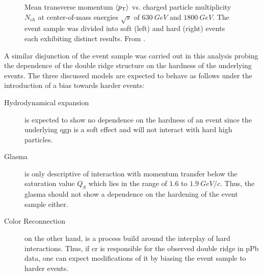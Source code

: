 \begin{figure}
\begin{subfigure}[b]{0.45\textwidth}
  \end{subfigure}
  \caption[Mean transverse momentum $\left< \pt \right>$ vs. charged particle multiplicity $N_{ch}$ at center-of-mass energies $\sqrt{s}$ of $\SI{630}{GeV}$ and $\SI{1800}{GeV}$.]{Mean transverse momentum $\left< \pt \right>$ vs. charged particle multiplicity $N_{ch}$ at center-of-mass energies $\sqrt{s}$ of $\SI{630}{GeV}$ and $\SI{1800}{GeV}$. The event sample was divided into soft (left) and hard (right) events each exhibiting distinct results. From \cite{Acosta2002}.}
    \label{fig:soft_hard_example}
\end{figure}

A similar disjunction of the event sample was carried out in this analysis probing the dependence of the double ridge structure on the hardness of the underlying events. The three discussed models are expected to behave as follows under the introduction of a bias towards harder events:
\begin{description}
\item [Hydrodynamical expansion] is expected to show no dependence on the hardness of an event since the underlying \gls{qgp} is a soft effect and will not interact with hard high \pt particles.
\item [Glasma] is only descriptive of interaction with momentum transfer below the saturation value $Q_S$ which lies in the range of $1.6$ to $\SI{1.9}{GeV/c}$. Thus, the glasma should not show a dependence on the hardening of the event sample either.
\item [Color Reconnection] on the other hand, is a process build around the interplay of hard interactions. Thus, if \gls{cr} is responsible for the observed double ridge in \gls{pPb} data, one can expect modifications of it by biasing the event sample to harder events.
\end{description}

